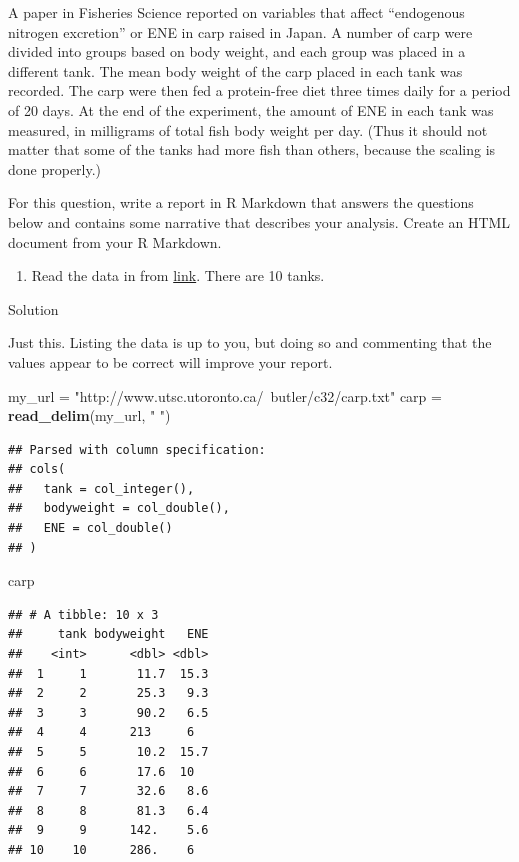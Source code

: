 \documentclass[]{tufte-book}
\newenvironment{Shaded}{}{}
\newcommand{\KeywordTok}[1]{\textcolor[rgb]{0.00,0.44,0.13}{\textbf{#1}}}
\newcommand{\NormalTok}[1]{#1}
\newcommand{\StringTok}[1]{\textcolor[rgb]{0.25,0.44,0.63}{#1}}
\providecommand{\tightlist}{%
  \setlength{\itemsep}{0pt}\setlength{\parskip}{0pt}}
\theoremstyle{definition}
\theoremstyle{definition}
\theoremstyle{definition}
\theoremstyle{remark}
\begin{document}
A paper in Fisheries Science reported on variables that affect
``endogenous nitrogen excretion'' or ENE in carp raised in Japan. A
number of carp were divided into groups based on body weight, and each
group was placed in a different tank. The mean body weight of the carp
placed in each tank was recorded. The carp were then fed a protein-free
diet three times daily for a period of 20 days. At the end of the
experiment, the amount of ENE in each tank was measured, in milligrams
of total fish body weight per day. (Thus it should not matter that some
of the tanks had more fish than others, because the scaling is done
properly.)

For this question, write a report in R Markdown that answers the
questions below and contains some narrative that describes your
analysis. Create an HTML document from your R Markdown.

\begin{enumerate}
\def\labelenumi{(\alph{enumi})}
\tightlist
\item
  Read the data in from
  \href{http://www.utsc.utoronto.ca/~butler/c32/carp.txt}{link}. There
  are 10 tanks.
\end{enumerate}

Solution

Just this. Listing the data is up to you, but doing so and commenting
that the values appear to be correct will improve your report.

\begin{Shaded}
\begin{Highlighting}[]
\NormalTok{my_url =}\StringTok{ "http://www.utsc.utoronto.ca/~butler/c32/carp.txt"}
\NormalTok{carp =}\StringTok{ }\KeywordTok{read_delim}\NormalTok{(my_url, }\StringTok{" "}\NormalTok{)}
\end{Highlighting}
\end{Shaded}

\begin{verbatim}
## Parsed with column specification:
## cols(
##   tank = col_integer(),
##   bodyweight = col_double(),
##   ENE = col_double()
## )
\end{verbatim}

\begin{Shaded}
\begin{Highlighting}[]
\NormalTok{carp}
\end{Highlighting}
\end{Shaded}

\begin{verbatim}
## # A tibble: 10 x 3
##     tank bodyweight   ENE
##    <int>      <dbl> <dbl>
##  1     1       11.7  15.3
##  2     2       25.3   9.3
##  3     3       90.2   6.5
##  4     4      213     6  
##  5     5       10.2  15.7
##  6     6       17.6  10  
##  7     7       32.6   8.6
##  8     8       81.3   6.4
##  9     9      142.    5.6
## 10    10      286.    6
\end{verbatim}
\end{document}
